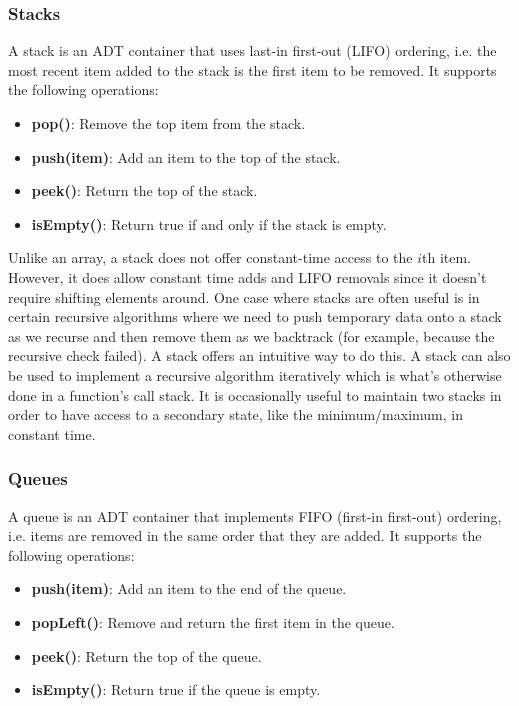 \documentclass{article}
\begin{document}
    \subsubsection{Stacks}
    A stack is an ADT container that uses last-in first-out (LIFO) ordering, i.e. the most recent item added to the stack is the first item to be removed. It supports the following operations:
    \begin{itemize}
        \item  \textbf{pop()}: Remove the top item from the stack.
        \item  \textbf{push(item)}: Add an item to the top of the stack.
        \item \textbf{peek()}: Return the top of the stack.
        \item \textbf{isEmpty()}: Return true if and only if the stack is empty.
    \end{itemize}
    Unlike an array, a stack does not offer constant-time access to the $i$th item. However, it does allow constant time adds and LIFO removals since it doesn't require shifting elements around. One case where stacks are often useful is in certain recursive algorithms where we need to push temporary data onto a stack as we recurse and then remove them as we backtrack (for example, because the recursive check failed). A stack offers an intuitive way to do this. A stack can also be used to implement a recursive algorithm iteratively which is what's otherwise done in a function's call stack. It is occasionally useful to maintain two stacks in order to have access to a secondary state, like the minimum/maximum, in constant time.
    
    \subsubsection{Queues}
    A queue is an ADT container that implements FIFO (first-in first-out) ordering, i.e. items are removed in the same order that they are added. It supports the following operations: 
    \begin{itemize}
        \item \textbf{push(item)}: Add an item to the end of the queue.
        \item \textbf{popLeft()}: Remove and return the first item in the queue.
        \item \textbf{peek()}: Return the top of the queue.
        \item \textbf{isEmpty()}: Return true if the queue is empty. 
    \end{itemize}
    
\end{document}
